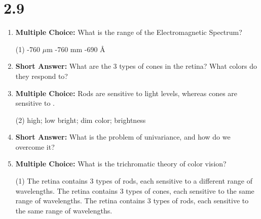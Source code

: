\squigglyline


\section*{2.9}

\begin{enumerate}[label=\textbf{Q2.9.\arabic*}]
      \item \textbf{Multiple Choice:} What is the range of the Electromagnetic Spectrum?
            \begin{tasks}[label=\textcolor{draculafg}{(\Alph*)}, item-format=\color{draculafg}, label-width=1.5em, item-indent=1.7em](1)
                  -760 \(\mu\)m
                  \task {}
                  -760 mm
                  -690 \AA
            \end{tasks}

      \item \textbf{Short Answer:} What are the 3 types of cones in the retina? What colors do they respond to? \\

      \item \textbf{Multiple Choice:} Rods are sensitive to \underline{\hspace{3cm}} light levels, whereas cones are sensitive to \underline{\hspace{3cm}}. 
            \begin{tasks}[label=\textcolor{draculafg}{(\Alph*)}, item-format=\color{draculafg}, label-width=1.5em, item-indent=1.7em](2)
                  \task high; low
                  \task {}
                  \task bright; dim
                  \task color; brightness
            \end{tasks}

      \item \textbf{Short Answer:} What is the problem of univariance, and how do we overcome it? \\

      \item \textbf{Multiple Choice:} What is the trichromatic theory of color vision?
            \begin{tasks}[label=\textcolor{draculafg}{(\Alph*)}, item-format=\color{draculafg}, label-width=1.5em, item-indent=1.7em](1)
                  \task The retina contains 3 types of rods, each sensitive to a different range of wavelengths.
                  \task The retina contains 3 types of cones, each sensitive to the same range of wavelengths.
                  \task {}
                  \task The retina contains 3 types of rods, each sensitive to the same range of wavelengths.
            \end{tasks}


\end{enumerate}

